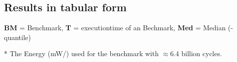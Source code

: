 \documentclass{../template/ffhsthesis}
\begin{document}
\begin{landscape}
\section{Results in tabular form}
\centering
\thispagestyle{empty}
\par
\vspace{10pt}
\textbf{BM} = Benchmark, \textbf{T} = executiontime of an Bechmark, \textbf{Med} = Median (-quantile)
\par
* The Energy (mW/) used for the benchmark with $\approx$6.4 billion cycles.
\end{landscape}
\end{document}
